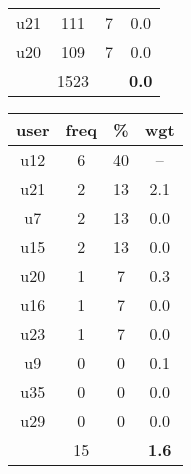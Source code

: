 \begin{appendices}
\begin{table}
\begin{tabular}{ |c|c|c|c| }
	u21 & 111 & 7 & 0.0 \\
	u20 & 109 & 7 & 0.0 \\
	 & 1523 & & \textbf{0.0} \\
	\hline
\end{tabular}
\begin{tabular}{ |c|c|c|c| }
	\hline
	\textbf{user} & \textbf{freq} & \textbf{\%} & \textbf{wgt} \\
	\hline
	u12 & 6 & 40 & -- \\
	u21 & 2 & 13 & 2.1 \\
	u7 & 2 & 13 & 0.0 \\
	u15 & 2 & 13 & 0.0 \\
	u20 & 1 & 7 & 0.3 \\
	u16 & 1 & 7 & 0.0 \\
	u23 & 1 & 7 & 0.0 \\
	u9 & 0 & 0 & 0.1 \\
	u35 & 0 & 0 & 0.0 \\
	u29 & 0 & 0 & 0.0 \\
	 & 15 & & \textbf{1.6} \\
	\hline
\end{tabular}
\end{table}


\end{appendices}
